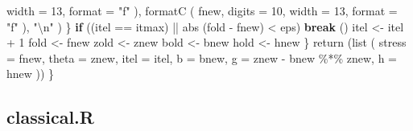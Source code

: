 \documentclass[
  12pt,
]{book}
\newenvironment{Shaded}{\begin{snugshade}}{\end{snugshade}}
\newcommand{\AttributeTok}[1]{\textcolor[rgb]{0.77,0.63,0.00}{#1}}
\newcommand{\ControlFlowTok}[1]{\textcolor[rgb]{0.13,0.29,0.53}{\textbf{#1}}}
\newcommand{\DecValTok}[1]{\textcolor[rgb]{0.00,0.00,0.81}{#1}}
\newcommand{\FunctionTok}[1]{\textcolor[rgb]{0.00,0.00,0.00}{#1}}
\newcommand{\NormalTok}[1]{#1}
\newcommand{\OtherTok}[1]{\textcolor[rgb]{0.56,0.35,0.01}{#1}}
\newcommand{\SpecialCharTok}[1]{\textcolor[rgb]{0.00,0.00,0.00}{#1}}
\newcommand{\StringTok}[1]{\textcolor[rgb]{0.31,0.60,0.02}{#1}}
\theoremstyle{definition}
\theoremstyle{definition}
\theoremstyle{definition}
\theoremstyle{definition}
\theoremstyle{remark}
\begin{document}
\begin{Shaded}
\begin{Highlighting}[]
            \AttributeTok{width =} \DecValTok{13}\NormalTok{,}
            \AttributeTok{format =} \StringTok{"f"}
\NormalTok{          ),}
          \FunctionTok{formatC}\NormalTok{ (}
\NormalTok{            fnew,}
            \AttributeTok{digits =} \DecValTok{10}\NormalTok{,}
            \AttributeTok{width =} \DecValTok{13}\NormalTok{,}
            \AttributeTok{format =} \StringTok{"f"}
\NormalTok{          ),}
          \StringTok{"}\SpecialCharTok{\textbackslash{}n}\StringTok{"}
\NormalTok{        )}
\NormalTok{      \}}
      \ControlFlowTok{if}\NormalTok{ ((itel }\SpecialCharTok{==}\NormalTok{ itmax) }\SpecialCharTok{||} \FunctionTok{abs}\NormalTok{ (fold }\SpecialCharTok{{-}}\NormalTok{ fnew) }\SpecialCharTok{\textless{}}\NormalTok{ eps)}
        \ControlFlowTok{break}\NormalTok{ ()}
\NormalTok{      itel }\OtherTok{\textless{}{-}}\NormalTok{ itel }\SpecialCharTok{+} \DecValTok{1}
\NormalTok{      fold }\OtherTok{\textless{}{-}}\NormalTok{ fnew}
\NormalTok{      zold }\OtherTok{\textless{}{-}}\NormalTok{ znew}
\NormalTok{      bold }\OtherTok{\textless{}{-}}\NormalTok{ bnew}
\NormalTok{      hold }\OtherTok{\textless{}{-}}\NormalTok{ hnew}
\NormalTok{    \}}
    \FunctionTok{return}\NormalTok{ (}\FunctionTok{list}\NormalTok{ (}
      \AttributeTok{stress =}\NormalTok{ fnew,}
      \AttributeTok{theta =}\NormalTok{ znew,}
      \AttributeTok{itel =}\NormalTok{ itel,}
      \AttributeTok{b =}\NormalTok{ bnew,}
      \AttributeTok{g =}\NormalTok{ znew }\SpecialCharTok{{-}}\NormalTok{ bnew }\SpecialCharTok{\%*\%}\NormalTok{ znew,}
      \AttributeTok{h =}\NormalTok{ hnew}
\NormalTok{    ))}
\NormalTok{  \}}
\end{Highlighting}
\end{Shaded}

\hypertarget{apcodeclass}{%
\subsection{classical.R}\label{apcodeclass}}
\end{document}
